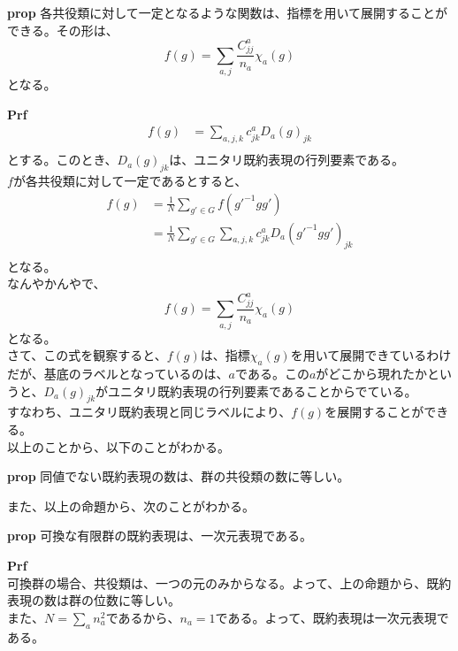 \documentclass[a4paper,11pt]{jsarticle}
\begin{document}
\begin{itembox}[l]{\textbf{prop}}
    各共役類に対して一定となるような関数は、指標を用いて展開することができる。その形は、
    \begin{equation}
        f(g) = \sum_{a,j}\frac{C_{jj}^a}{n_a}\chi_a(g)
    \end{equation}
    となる。\\

\end{itembox}
\textbf{Prf}\\
\begin{align}
    f(g) &= \sum_{a,j,k} c_{jk}^a D_a(g)_{jk}\\
\end{align}
とする。このとき、$D_a(g)_{jk}$は、ユニタリ既約表現の行列要素である。\\
$f$が各共役類に対して一定であるとすると、
\begin{align}
    f(g) &= \frac{1}{N} \sum_{g' \in G} f(g'^{-1}gg')\\
    &= \frac{1}{N} \sum_{g' \in G} \sum_{a,j,k} c_{jk}^a D_a(g'^{-1}gg')_{jk}\\
\end{align}
となる。\\%
なんやかんやで、
\begin{equation}
    f(g) = \sum_{a,j}\frac{C_{jj}^a}{n_a}\chi_a(g)
\end{equation}
となる。\\
さて、この式を観察すると、$f(g)$は、指標$\chi_a(g)$を用いて展開できているわけだが、基底のラベルとなっているのは、$a$である。この$a$がどこから現れたかというと、$D_a(g)_{jk}$がユニタリ既約表現の行列要素であることからでている。\\
すなわち、ユニタリ既約表現と同じラベルにより、$f(g)$を展開することができる。\\
以上のことから、以下のことがわかる。\\
\begin{itembox}[l]{\textbf{prop}}
    同値でない既約表現の数は、群の共役類の数に等しい。
\end{itembox}
また、以上の命題から、次のことがわかる。\\
\begin{itembox}[l]{\textbf{prop}}
    可換な有限群の既約表現は、一次元表現である。
\end{itembox}
\textbf{Prf}\\
可換群の場合、共役類は、一つの元のみからなる。よって、上の命題から、既約表現の数は群の位数に等しい。\\
また、$N=\sum_{a} n_a^2$であるから、$n_a=1$である。よって、既約表現は一次元表現である。\\



    
\end{document}
